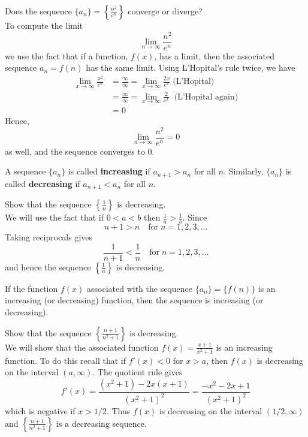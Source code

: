 \documentclass[handout]{ximera}
\begin{document}
\begin{example}
Does the sequence $\displaystyle \{a_n\} = \left\{\frac{n^2}{e^n}\right\}$ converge or diverge?\\
To compute the limit
\[
\lim_{n \to \infty} \frac{n^2}{e^n}
\]
we use the fact that if a function, $f(x)$, has a limit, then the associated sequence
$a_n = f(n)$ has the same limit. Using L'Hopital's rule twice, we have
\begin{align*}
\lim_{x \to \infty} \frac{x^2}{e^x} &= \frac{\infty}{\infty} = \lim_{x \to \infty} \frac{2x}{e^x} \;\text{(L'Hopital)}\\
                                  &=\frac{\infty}{\infty} = \lim_{x \to \infty} \frac{2}{e^x} \;\;\text{(L'Hopital again)}\\
                                  &=0
\end{align*}
Hence, 
\[
\lim_{n \to \infty} \frac{n^2}{e^n} =0
\]
as well, and the sequence converges to $0$. 
\end{example}

\begin{definition} 
A sequence $\{a_n\}$ is called {\bf increasing} if $a_{n+1} > a_n$ for all $n$.
Similarly, $\{a_n\}$ is called {\bf decreasing} if $a_{n+1} < a_n$ for all $n$.
\end{definition}

\begin{example}
Show that the sequence $\left\{\frac{1}{n}\right\}$ is decreasing.\\
We will use the fact that if $0<a<b$ then $\frac{1}{a} > \frac{1}{b}$.  Since
\[
n+1 > n \quad \text{for} \; n = 1, 2, 3, \ldots
\]
Taking reciprocals gives
\[
\frac{1}{n+1} < \frac{1}{n} \quad \text{for} \; n = 1, 2, 3, \ldots
\]
and hence the sequence $\left\{\frac{1}{n}\right\}$ is decreasing.
\end{example}


\begin{remark}
If the function $f(x)$ associated with the sequence $\{a_n\} = \{f(n)\}$ is an increasing (or decreasing) function, then the sequence 
is increasing (or decreasing).
\end{remark}

\begin{example}
Show that the sequence $\left\{\frac{n+1}{n^2 + 1}\right\}$ is decreasing.\\
We will show that the associated function $f(x) = \frac{x+1}{x^2 + 1}$ is an increasing function. To do this recall that if $f'(x)< 0$ for $x>a$,
then $f(x)$ is decreasing on the interval $(a,\infty)$. The quotient rule gives
\[
f'(x) = \frac{\left(x^2+1\right) - 2x(x+1)}{(x^2+1)^2} = \frac{-x^2-2x+1}{(x^2+1)^2}
\]
which is negative if $x>1/2$. Thus $f(x)$ is decreasing on the interval $(1/2, \infty)$ and $\left\{\frac{n+1}{n^2 + 1} \right\}$
is a decreasing sequence.
\end{example}
\end{document}
